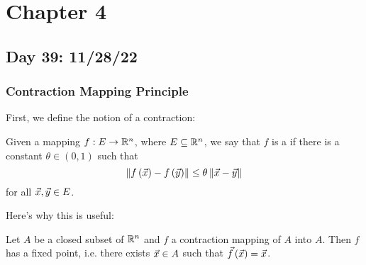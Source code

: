 \documentclass[main.tex]{subfiles}
\begin{document}
\section{Chapter 4}
\subsection{Day 39: 11/28/22}
\subsubsection{Contraction Mapping Principle}

First, we define the notion of a contraction:

\begin{definition}
    Given a mapping $f : E\to \mathbb R^n$, where $E\subseteq \mathbb R^n$, we say that $f$ is a  if there is a constant $\theta \in (0, 1)$ such that
    \[\left\lVert f\left( \vec{x} \right) - f\left( \vec{y} \right) \right\rVert \le \theta\left\lVert \vec{x} - \vec{y} \right\rVert\]
    for all $\vec{x}, \vec{y}\in E$.
\end{definition}

Here's why this is useful:
\begin{theorem}
    Let $A$ be a closed subset of $\mathbb R^n$ and $f$ a contraction mapping of $A$ into $A$. Then $f$ has a fixed point, i.e. there exists $\vec{x}\in A$ such that $\vec{f}\left( \vec{x} \right) = \vec{x}$.
\end{theorem}
\end{document}
